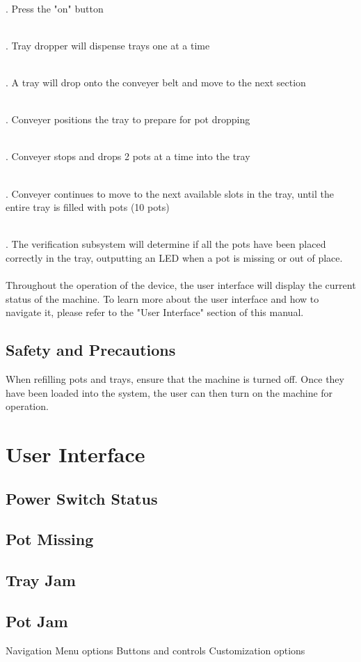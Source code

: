 \documentclass{article}
\begin{document}
\\ .	Press the "on" button

\\ .	Tray dropper will dispense trays one at a time

\\ .	A tray will drop onto the conveyer belt and move to the next section

\\ .	Conveyer positions the tray to prepare for pot dropping

\\ .	Conveyer stops and drops 2 pots at a time into the tray

\\ .	Conveyer continues to move to the next available slots in the tray, until the entire tray is filled with pots (10 pots)

\\ .	The verification subsystem will determine if all the pots have been placed correctly in the tray, outputting an LED when a pot is missing or out of place. 
\\
\\ \noindent Throughout the operation of the device, the user interface will display the current status of the machine. To learn more about the user interface and how to navigate it, please refer to the "User Interface" section of this manual.
\subsection{Safety and Precautions}
When refilling pots and trays, ensure that the machine is turned off. Once they have been loaded into the system, the user can then turn on the machine for operation.
\section{User Interface}
\subsection{Power Switch Status}
\subsection{Pot Missing}
\subsection{Tray Jam}
\subsection{Pot Jam}
Navigation
Menu options
Buttons and controls
Customization options
\end{document}
